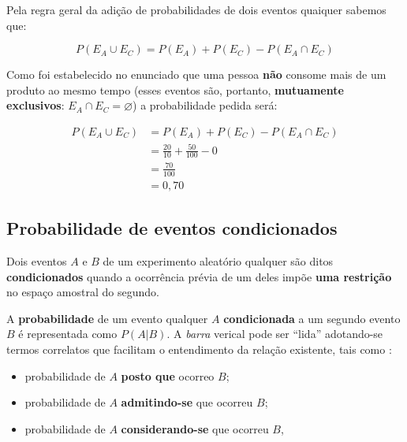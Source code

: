 \documentclass[
]{book}
\providecommand{\tightlist}{%
  \setlength{\itemsep}{0pt}\setlength{\parskip}{0pt}}
\begin{document}
\hfill\break

Pela regra geral da adição de probabilidades de dois eventos quaiquer sabemos que:

\hfill\break

\[
P(E_{A} \cup E_{C}) = P(E_{A}) + P(E_{C}) - P(E_{A} \cap E_{C})
\]

\hfill\break

Como foi estabelecido no enunciado que uma pessoa \textbf{não} consome mais de um produto ao mesmo tempo (esses eventos são, portanto, \textbf{mutuamente exclusivos}: \(E_{A} \cap E_{C}=\varnothing\)) a probabilidade pedida será:

\hfill\break

\begin{align*}
P(E_{A} \cup E_{C}) & = P(E_{A}) + P(E_{C}) - P(E_{A} \cap E_{C}) \\
                    & = \frac{20}{10} + \frac{50}{100} - 0 \\
                    & =  \frac{70}{100} \\
                    & =  0,70    
\end{align*}

\hfill\break

\hypertarget{probabilidade-de-eventos-condicionados}{%
\subsection{Probabilidade de eventos condicionados}\label{probabilidade-de-eventos-condicionados}}

Dois eventos \(A\) e \(B\) de um experimento aleatório qualquer são ditos \textbf{condicionados} quando a ocorrência prévia de um deles impõe \textbf{uma restrição} no espaço amostral do segundo.

\hfill\break

A \textbf{probabilidade} de um evento qualquer \(A\) \textbf{condicionada} a um segundo evento \(B\) é representada como \(P(A|B)\). A \emph{barra} verical pode ser ``lida'' adotando-se termos correlatos que facilitam o entendimento da relação existente, tais como :

\hfill\break

\begin{itemize}
\tightlist
\item
  probabilidade de \(A\) \textbf{posto que} ocorreo \(B\);
\item
  probabilidade de \(A\) \textbf{admitindo-se} que ocorreu \(B\);
\item
  probabilidade de \(A\) \textbf{considerando-se} que ocorreu \(B\),
\end{itemize}
\end{document}
